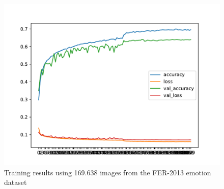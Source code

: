 \documentclass[runningheads,a4paper,11pt]{report}
\begin{document}
\begin{figure}[htbp]
\begin{center}
	\includegraphics[scale=0.8]{Fig/fer_training_28k_01_mean_square_filtered_augmented_x6.pdf}
	\caption{Training results using 169.638 images from the FER-2013 emotion dataset}
	\label{fer_training_28k_01_mean_square_filtered_augmented_x6}
\end{center}
\end{figure}
\end{document}
